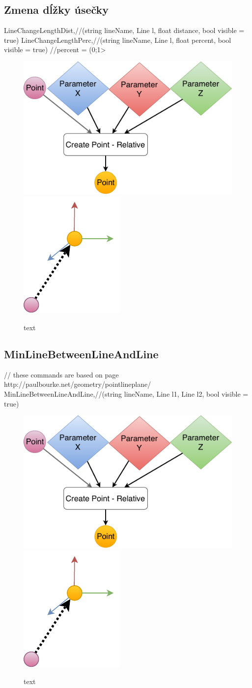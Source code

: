 \subsection{Zmena dĺžky úsečky}
		LineChangeLengthDist,//(string lineName, Line l, float distance, bool visible = true)
		LineChangeLengthPerc,//(string lineName, Line l, float percent, bool visible = true) //percent = (0;1>

\begin{figure}[H]
	\centering
	\includegraphics[height=0.3\textwidth]{obrazky-figures/Diagram/DP Navrh operacii-0D - Point2.pdf}
	\includegraphics[height=0.3\textwidth]{obrazky-figures/Diagram/Draw/1Points/DP Navrh operacii-0D - PointRelative.pdf}
	\caption{text}
	\label{fig:1}
\end{figure}


\subsection{MinLineBetweenLineAndLine}

		// these commands are based on page http://paulbourke.net/geometry/pointlineplane/
		MinLineBetweenLineAndLine,//(string lineName, Line l1, Line l2, bool visible = true)

\begin{figure}[H]
	\centering
	\includegraphics[height=0.3\textwidth]{obrazky-figures/Diagram/DP Navrh operacii-0D - Point2.pdf}
	\includegraphics[height=0.3\textwidth]{obrazky-figures/Diagram/Draw/1Points/DP Navrh operacii-0D - PointRelative.pdf}
	\caption{text}
	\label{fig:1}
\end{figure}

